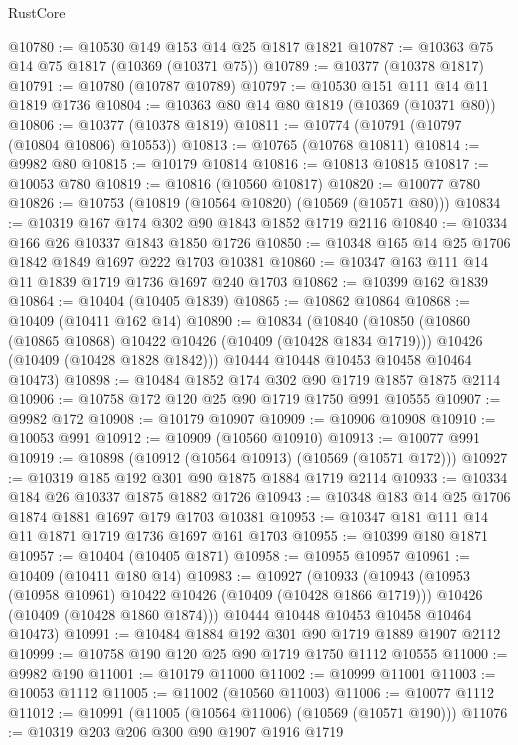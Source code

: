 \begin{lexlean}{RustCore}
\begin{coremodule}
@10780 := @10530 @149 @153 @14 @25 @1817 @1821
@10787 := @10363 @75 @14 @75 @1817 (@10369 (@10371 @75))
@10789 := @10377 (@10378 @1817)
@10791 := @10780 (@10787 @10789)
@10797 := @10530 @151 @111 @14 @11 @1819 @1736
@10804 := @10363 @80 @14 @80 @1819 (@10369 (@10371 @80))
@10806 := @10377 (@10378 @1819)
@10811 := @10774 (@10791 (@10797 (@10804 @10806) @10553))
@10813 := @10765 (@10768 @10811)
@10814 := @9982 @80
@10815 := @10179 @10814
@10816 := @10813 @10815
@10817 := @10053 @780
@10819 := @10816 (@10560 @10817)
@10820 := @10077 @780
@10826 := @10753 (@10819 (@10564 @10820) (@10569 (@10571 @80)))
@10834 := @10319 @167 @174 @302 @90 @1843 @1852 @1719 @2116
@10840 := @10334 @166 @26 @10337 @1843 @1850 @1726
@10850 := @10348 @165 @14 @25 @1706 @1842 @1849 @1697 @222 @1703 @10381
@10860 := @10347 @163 @111 @14 @11 @1839 @1719 @1736 @1697 @240 @1703
@10862 := @10399 @162 @1839
@10864 := @10404 (@10405 @1839)
@10865 := @10862 @10864
@10868 := @10409 (@10411 @162 @14)
@10890 := @10834
    (@10840
      (@10850
        (@10860 (@10865 @10868) @10422 @10426 (@10409 (@10428 @1834 @1719)))
        @10426
        (@10409 (@10428 @1828 @1842)))
      @10444
      @10448
      @10453
      @10458
      @10464
      @10473)
@10898 := @10484 @1852 @174 @302 @90 @1719 @1857 @1875 @2114
@10906 := @10758 @172 @120 @25 @90 @1719 @1750 @991 @10555
@10907 := @9982 @172
@10908 := @10179 @10907
@10909 := @10906 @10908
@10910 := @10053 @991
@10912 := @10909 (@10560 @10910)
@10913 := @10077 @991
@10919 := @10898 (@10912 (@10564 @10913) (@10569 (@10571 @172)))
@10927 := @10319 @185 @192 @301 @90 @1875 @1884 @1719 @2114
@10933 := @10334 @184 @26 @10337 @1875 @1882 @1726
@10943 := @10348 @183 @14 @25 @1706 @1874 @1881 @1697 @179 @1703 @10381
@10953 := @10347 @181 @111 @14 @11 @1871 @1719 @1736 @1697 @161 @1703
@10955 := @10399 @180 @1871
@10957 := @10404 (@10405 @1871)
@10958 := @10955 @10957
@10961 := @10409 (@10411 @180 @14)
@10983 := @10927
    (@10933
      (@10943
        (@10953 (@10958 @10961) @10422 @10426 (@10409 (@10428 @1866 @1719)))
        @10426
        (@10409 (@10428 @1860 @1874)))
      @10444
      @10448
      @10453
      @10458
      @10464
      @10473)
@10991 := @10484 @1884 @192 @301 @90 @1719 @1889 @1907 @2112
@10999 := @10758 @190 @120 @25 @90 @1719 @1750 @1112 @10555
@11000 := @9982 @190
@11001 := @10179 @11000
@11002 := @10999 @11001
@11003 := @10053 @1112
@11005 := @11002 (@10560 @11003)
@11006 := @10077 @1112
@11012 := @10991 (@11005 (@10564 @11006) (@10569 (@10571 @190)))
@11076 := @10319
    @203
    @206
    @300
    @90
    @1907
    @1916
    @1719

\end{coremodule}
\end{lexlean}
